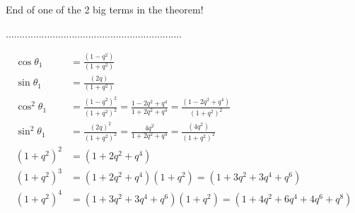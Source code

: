 \documentclass[12pt]{article}
\begin{document}
End of one of the 2 big terms in the theorem!

................................................................


\begin{align}
    \cos\theta_1 &= \frac{(1-q^2)}{(1+q^2)}\\
    \sin\theta_1 &= \frac{(2q)}{(1+q^2)}\\
    \cos^2\theta_1 &= \frac{(1-q^2)^2}{(1+q^2)^2} = \frac{1-2q^2+q^4}{1+2q^2+q^4} = \frac{(1-2q^2+q^4)}{(1+q^2)^2}\\
    \sin^2\theta_1 &= \frac{(2q)^2}{(1+q^2)^2} = \frac{4q^2}{1+2q^2+q^4} = \frac{(4q^2)}{(1+q^2)^2}\\
    (1+q^2)^2 &= (1+2q^2+q^4)\\
    (1+q^2)^3 &= (1+2q^2+q^4)(1+q^2) = (1+3q^2+3q^4+q^6)\\
    (1+q^2)^4 &= (1+3q^2+3q^4+q^6)(1+q^2) = (1+4q^2+6q^4 +4q^6+q^8)
\end{align}
\end{document}
